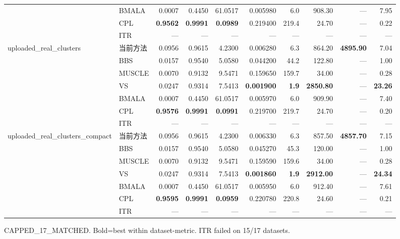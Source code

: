 \begin{table}[htbp]
\begin{tabular}{llrrrrrrrr}
 & BMALA & 0.0007 & 0.4450 & 61.0517 & 0.005980 & 6.0 & 908.30 & — & 7.95 \\
 & CPL & \textbf{0.9562} & \textbf{0.9991} & \textbf{0.0989} & 0.219400 & 219.4 & 24.70 & — & 0.22 \\
 & ITR & — & — & — & — & — & — & — & — \\
\midrule
\multirow{7}{*}{uploaded\_real\_clusters} & 当前方法 & 0.0956 & 0.9615 & 4.2300 & 0.006280 & 6.3 & 864.20 & \textbf{4895.90} & 7.04 \\
 & BBS & 0.0157 & 0.9540 & 5.0580 & 0.044200 & 44.2 & 122.80 & — & 1.00 \\
 & MUSCLE & 0.0070 & 0.9132 & 9.5471 & 0.159650 & 159.7 & 34.00 & — & 0.28 \\
 & VS & 0.0247 & 0.9314 & 7.5413 & \textbf{0.001900} & \textbf{1.9} & \textbf{2850.80} & — & \textbf{23.26} \\
 & BMALA & 0.0007 & 0.4450 & 61.0517 & 0.005970 & 6.0 & 909.90 & — & 7.40 \\
 & CPL & \textbf{0.9576} & \textbf{0.9991} & \textbf{0.0991} & 0.219700 & 219.7 & 24.70 & — & 0.20 \\
 & ITR & — & — & — & — & — & — & — & — \\
\midrule
\multirow{7}{*}{uploaded\_real\_clusters\_compact} & 当前方法 & 0.0956 & 0.9615 & 4.2300 & 0.006330 & 6.3 & 857.50 & \textbf{4857.70} & 7.15 \\
 & BBS & 0.0157 & 0.9540 & 5.0580 & 0.045270 & 45.3 & 120.00 & — & 1.00 \\
 & MUSCLE & 0.0070 & 0.9132 & 9.5471 & 0.159590 & 159.6 & 34.00 & — & 0.28 \\
 & VS & 0.0247 & 0.9314 & 7.5413 & \textbf{0.001860} & \textbf{1.9} & \textbf{2912.00} & — & \textbf{24.34} \\
 & BMALA & 0.0007 & 0.4450 & 61.0517 & 0.005950 & 6.0 & 912.40 & — & 7.61 \\
 & CPL & \textbf{0.9595} & \textbf{0.9991} & \textbf{0.0959} & 0.220780 & 220.8 & 24.60 & — & 0.21 \\
 & ITR & — & — & — & — & — & — & — & — \\
\midrule
\bottomrule
\end{tabular}
\vspace{4pt}
\footnotesize{CAPPED_17_MATCHED. Bold=best within dataset-metric. ITR failed on 15/17 datasets.}
\end{table}

